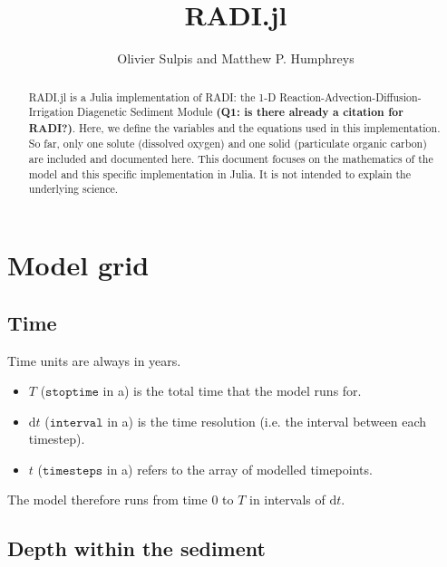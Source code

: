 \documentclass[a4paper]{article}
\newcommand{\D}[1]{\mathrm{d}#1}
\newcommand{\code}[1]{\texttt{#1}}
\newcommand{\wtf}[1]{\textcolor{Cerulean}{\textbf{#1}}}
\begin{document}
\title{RADI.jl}
\author{Olivier Sulpis and Matthew P. Humphreys}

\maketitle

\begin{abstract}
RADI.jl is a Julia implementation of RADI: the 1-D Reaction-Advection-Diffusion-Irrigation Diagenetic Sediment Module \wtf{(Q1: is there already a citation for RADI?)}.  Here, we define the variables and the equations used in this implementation. So far, only one solute (dissolved oxygen) and one solid (particulate organic carbon) are included and documented here.  This document focuses on the mathematics of the model and this specific implementation in Julia.  It is not intended to explain the underlying science.
\end{abstract}



\section{Model grid}

\subsection{Time}

Time units are always in years.
\begin{itemize}
  \item $T$ ($\code{stoptime}$ in a) is the total time that the model runs for.
  \item $\D{t}$ ($\code{interval}$ in a) is the time resolution (i.e. the interval between each timestep).
  \item $t$ ($\code{timesteps}$ in a) refers to the array of modelled timepoints.
\end{itemize}
The model therefore runs from time $0$ to $T$ in intervals of $\D{t}$.


\subsection{Depth within the sediment}
\end{document}
